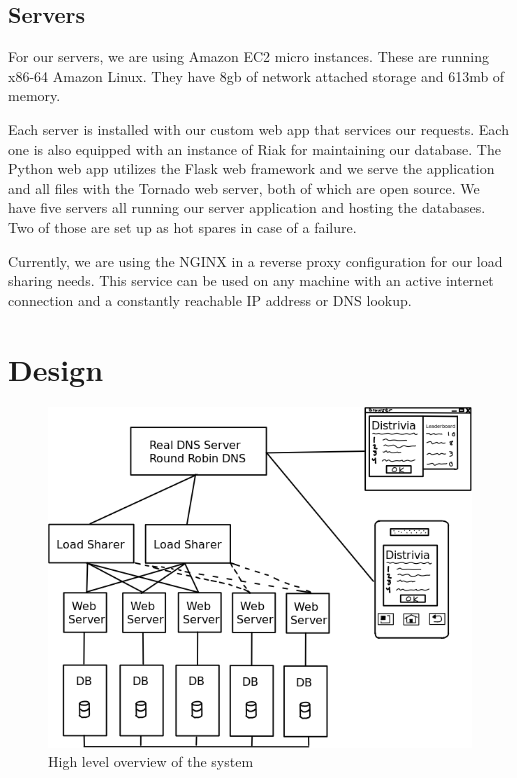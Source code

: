 \documentclass{dependencies/acm_proc_article-sp}
\begin{document}
\subsection{Servers}
For our servers, we are using Amazon EC2 micro instances.
These are running x86-64 Amazon Linux.
They have 8gb of network attached storage and 613mb of memory.

Each server is installed with our custom web app that services our requests.
Each one is also equipped with an instance of Riak for maintaining our database.
The Python web app utilizes the Flask web framework and we serve the application and all files with the Tornado web server, both of which are open source.
We have five servers all running our server application and hosting the databases.
Two of those are set up as hot spares in case of a failure.

Currently, we are using the NGINX \cite{nginx} in a reverse proxy configuration for our load sharing needs. This service can be used on any machine with an active internet connection and a constantly reachable IP address or DNS lookup.


\section{Design}
\begin{figure}[h!]
  \centering
    \includegraphics[scale=0.4]{diagram.png}
   \caption{High level overview of the system}
 \end{figure}
\end{document}
